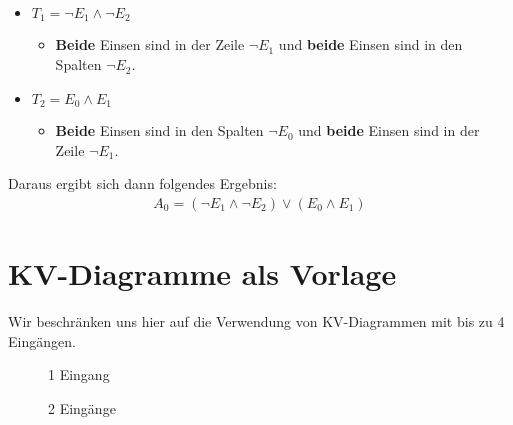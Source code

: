 \begin{example}
\begin{itemize}
\item $T_1 = \neg E_1 \wedge \neg E_2$
\begin{itemize}
\item \textbf{Beide} Einsen sind in der Zeile $\neg E_1$ und \textbf{beide} Einsen sind in den Spalten $\neg E_2$.
\end{itemize}
\item $T_2 = E_0 \wedge E_1$
\begin{itemize}
\item \textbf{Beide} Einsen sind in den Spalten $\neg E_0$ und \textbf{beide} Einsen sind in der Zeile $\neg E_1$.
\end{itemize}
\end{itemize}

Daraus ergibt sich dann folgendes Ergebnis:
\begin{align*}
A_0 = (\neg E_1 \wedge \neg E_2) \vee (E_0 \wedge E_1)
\end{align*}

\end{example}

\section{\acs{KV}-Diagramme als Vorlage}

Wir beschränken uns hier auf die Verwendung von \ac{KV}-Diagrammen mit bis zu \num{4} Eingängen.

\begin{figure}[htb]
\centering
\begin{minipage}{0.45\textwidth}
\centering
{}
\caption{\num{1} Eingang}
\label{figure-kv-diagramm-e-1}
\end{minipage}
\hfill
\begin{minipage}{0.45\textwidth}
\centering
{}
\caption{\num{2} Eingänge}
\label{figure-kv-diagramm-e-2}
\end{minipage}
\end{figure}

